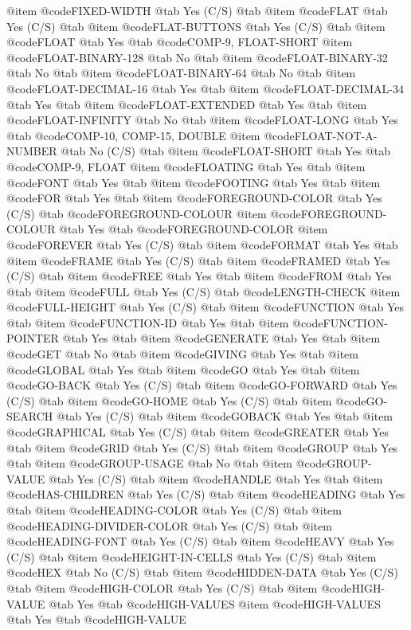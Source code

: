 @item @code{FIXED-WIDTH} @tab Yes	(C/S) @tab 
@item @code{FLAT} @tab Yes	(C/S) @tab 
@item @code{FLAT-BUTTONS} @tab Yes	(C/S) @tab 
@item @code{FLOAT} @tab Yes @tab @code{COMP-9, FLOAT-SHORT}
@item @code{FLOAT-BINARY-128} @tab No @tab 
@item @code{FLOAT-BINARY-32} @tab No @tab 
@item @code{FLOAT-BINARY-64} @tab No @tab 
@item @code{FLOAT-DECIMAL-16} @tab Yes @tab 
@item @code{FLOAT-DECIMAL-34} @tab Yes @tab 
@item @code{FLOAT-EXTENDED} @tab Yes @tab 
@item @code{FLOAT-INFINITY} @tab No @tab 
@item @code{FLOAT-LONG} @tab Yes @tab @code{COMP-10, COMP-15, DOUBLE}
@item @code{FLOAT-NOT-A-NUMBER} @tab No	(C/S) @tab 
@item @code{FLOAT-SHORT} @tab Yes @tab @code{COMP-9, FLOAT}
@item @code{FLOATING} @tab Yes @tab 
@item @code{FONT} @tab Yes @tab 
@item @code{FOOTING} @tab Yes @tab 
@item @code{FOR} @tab Yes @tab 
@item @code{FOREGROUND-COLOR} @tab Yes	(C/S) @tab @code{FOREGROUND-COLOUR}
@item @code{FOREGROUND-COLOUR} @tab Yes @tab @code{FOREGROUND-COLOR}
@item @code{FOREVER} @tab Yes	(C/S) @tab 
@item @code{FORMAT} @tab Yes @tab 
@item @code{FRAME} @tab Yes	(C/S) @tab 
@item @code{FRAMED} @tab Yes	(C/S) @tab 
@item @code{FREE} @tab Yes @tab 
@item @code{FROM} @tab Yes @tab 
@item @code{FULL} @tab Yes	(C/S) @tab @code{LENGTH-CHECK}
@item @code{FULL-HEIGHT} @tab Yes	(C/S) @tab 
@item @code{FUNCTION} @tab Yes @tab 
@item @code{FUNCTION-ID} @tab Yes @tab 
@item @code{FUNCTION-POINTER} @tab Yes @tab 
@item @code{GENERATE} @tab Yes @tab 
@item @code{GET} @tab No @tab 
@item @code{GIVING} @tab Yes @tab 
@item @code{GLOBAL} @tab Yes @tab 
@item @code{GO} @tab Yes @tab 
@item @code{GO-BACK} @tab Yes	(C/S) @tab 
@item @code{GO-FORWARD} @tab Yes	(C/S) @tab 
@item @code{GO-HOME} @tab Yes	(C/S) @tab 
@item @code{GO-SEARCH} @tab Yes	(C/S) @tab 
@item @code{GOBACK} @tab Yes @tab 
@item @code{GRAPHICAL} @tab Yes	(C/S) @tab 
@item @code{GREATER} @tab Yes @tab 
@item @code{GRID} @tab Yes	(C/S) @tab 
@item @code{GROUP} @tab Yes @tab 
@item @code{GROUP-USAGE} @tab No @tab 
@item @code{GROUP-VALUE} @tab Yes	(C/S) @tab 
@item @code{HANDLE} @tab Yes @tab 
@item @code{HAS-CHILDREN} @tab Yes	(C/S) @tab 
@item @code{HEADING} @tab Yes @tab 
@item @code{HEADING-COLOR} @tab Yes	(C/S) @tab 
@item @code{HEADING-DIVIDER-COLOR} @tab Yes	(C/S) @tab 
@item @code{HEADING-FONT} @tab Yes	(C/S) @tab 
@item @code{HEAVY} @tab Yes	(C/S) @tab 
@item @code{HEIGHT-IN-CELLS} @tab Yes	(C/S) @tab 
@item @code{HEX} @tab No	(C/S) @tab 
@item @code{HIDDEN-DATA} @tab Yes	(C/S) @tab 
@item @code{HIGH-COLOR} @tab Yes	(C/S) @tab 
@item @code{HIGH-VALUE} @tab Yes @tab @code{HIGH-VALUES}
@item @code{HIGH-VALUES} @tab Yes @tab @code{HIGH-VALUE}
